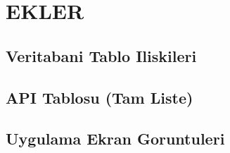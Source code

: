 \documentclass[12pt,a4paper,oneside]{report}
\begin{document}
\appendix
\chapter{EKLER}

\section{Veritabani Tablo Iliskileri}
\section{API Tablosu (Tam Liste)}
\section{Uygulama Ekran Goruntuleri}
\end{document}
